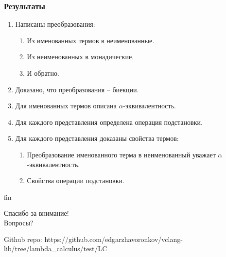 \documentclass{beamer}
\begin{document}
\begin{frame}\frametitle{Результаты}
    \begin{enumerate}
        \item Написаны преобразования:
            \begin{enumerate}
                \item Из именованных термов в неименованные.
                \item Из неименованных в монадические.
                \item И обратно.
            \end{enumerate}
        \item Доказано, что преобразования -- биекции.
        \item Для именованных термов описана $\alpha$-эквивалентность.
        \item Для каждого представления определена операция подстановки.
        \item Для каждого представления доказаны свойства термов:
            \begin{enumerate}  
                \item Преобразование именованного терма в неименованный уважает $\alpha$-эквивалентность.
                \item Свойства операции подстановки.  
            \end{enumerate}
    \end{enumerate}
\end{frame}

\begin{frame}{fin}
    \begin{center} 
        \Huge Спасибо за внимание! \\ Вопросы? 
    \end{center} 
    
    \begin{block}{Github repo:}
        \footnotesize{https://github.com/edgarzhavoronkov/vclang-lib/tree/lambda\_calculus/test/LC}
    \end{block}
\end{frame} 
\end{document}
